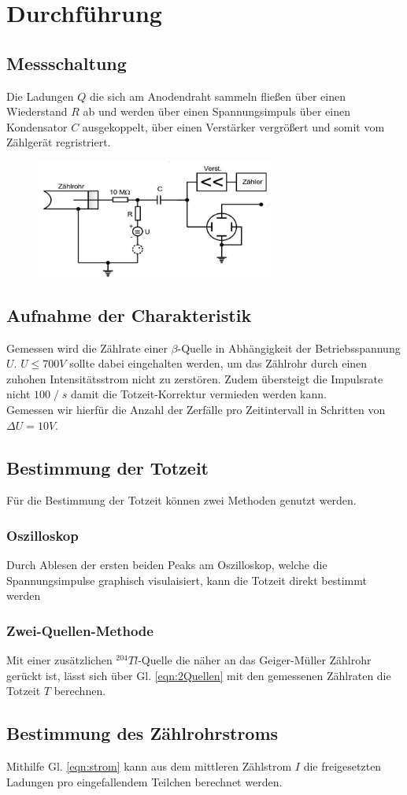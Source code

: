 \newpage
\section{Durchführung}
\subsection{Messschaltung}
Die Ladungen $Q$ die sich am Anodendraht sammeln fließen über einen
Wiederstand $R$ ab und werden über einen Spannungsimpuls über einen Kondensator $C$
ausgekoppelt, über einen Verstärker vergrößert und somit vom Zählgerät regristriert.
\begin{figure}
    \centering
    \includegraphics[width=0.7\textwidth]{input/messapperatur.jpg}
    \caption{\cite[226]{anleitung}}
\end{figure}

\subsection{Aufnahme der Charakteristik}
Gemessen wird die Zählrate einer $\beta$-Quelle in Abhängigkeit der Betriebsspannung $U$.
$U \leq 700\si{V}$ sollte dabei eingehalten werden, um das Zählrohr durch
einen zuhohen Intensitätsstrom nicht zu zerstören. Zudem übersteigt die Impulsrate nicht $100\;/\;\si{s}$
damit die Totzeit-Korrektur vermieden werden kann.\\
Gemessen wir hierfür die Anzahl der Zerfälle pro Zeitintervall in Schritten von $\Delta U=10\si{V}$.
\subsection{Bestimmung der Totzeit}
Für die Bestimmung der Totzeit können zwei Methoden genutzt werden.
\subsubsection*{Oszilloskop}
Durch Ablesen der ersten beiden Peaks am Oszilloskop, welche die Spannungsimpulse graphisch visulaisiert,
kann die Totzeit direkt bestimmt werden
\subsubsection*{Zwei-Quellen-Methode}
Mit einer zusätzlichen $^{204}Tl$-Quelle die näher an das Geiger-Müller Zählrohr gerückt ist,
lässt sich über Gl. \ref{eqn:2Quellen} mit den gemessenen Zählraten die Totzeit $T$ berechnen.
\subsection{Bestimmung des Zählrohrstroms}
Mithilfe Gl. \ref{eqn:strom} kann aus dem mittleren Zählstrom $I$
die freigesetzten Ladungen pro eingefallendem Teilchen berechnet werden. 
\label{sec:Durchfuehrung}

